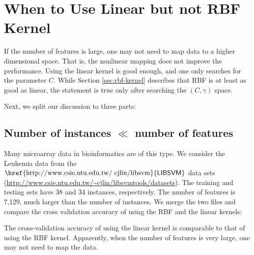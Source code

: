 \documentclass[12pt]{article}
\newcommand{\libsvm}{$\mbox{\href{http://www.csie.ntu.edu.tw/~cjlin/libsvm}{\sf LIBSVM}}$\xspace}
\begin{document}
\section{When to Use Linear but not
RBF Kernel}
\label{sec:when-use-linear}

If the number of features is large, one may
not need to map data to a higher dimensional
space. That is, 
the nonlinear mapping does not improve
the performance.
Using the linear kernel is good
enough, and one only searches for the parameter
$C$. While Section \ref{sec:rbf-kernel}
describes that RBF is at least as good as linear,
the statement is true only
after searching the $(C, \gamma)$ space.

Next, we split our discussion to three parts:

\subsection{Number of instances $\ll$ number of features}

Many microarray data in bioinformatics are of this type. We consider
the Leukemia data from the \libsvm data sets
(\url{http://www.csie.ntu.edu.tw/~cjlin/libsvmtools/datasets}). The
training and testing sets have 38 and 34 instances, respectively. The
number of features is 7,129, much larger than the number of instances.
We merge the two files and compare the cross validation accuracy of
using the RBF and the linear kernels:

The cross-validation accuracy of using the linear kernel is comparable to that of using the
  RBF kernel. Apparently, when the number of
features is
very large, one may not need to map the data.
\end{document}
